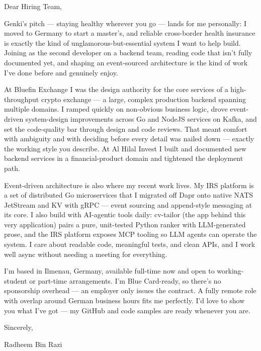 \documentclass[11pt,a4paper]{coverletter}
\begin{document}

\opening{Dear Hiring Team,}

Genki's pitch — staying healthy wherever you go — lands for me personally: I moved to Germany to start a master's, and reliable cross-border health insurance is exactly the kind of unglamorous-but-essential system I want to help build. Joining as the second developer on a backend team, reading code that isn't fully documented yet, and shaping an event-sourced architecture is the kind of work I've done before and genuinely enjoy.

At Bluefin Exchange I was the design authority for the core services of a high-throughput crypto exchange — a large, complex production backend spanning multiple domains. I ramped quickly on non-obvious business logic, drove event-driven system-design improvements across Go and NodeJS services on Kafka, and set the code-quality bar through design and code reviews. That meant comfort with ambiguity and with deciding before every detail was nailed down — exactly the working style you describe. At Al Hilal Invest I built and documented new backend services in a financial-product domain and tightened the deployment path.

Event-driven architecture is also where my recent work lives. My IRS platform is a set of distributed Go microservices that I migrated off Dapr onto native NATS JetStream and KV with gRPC — event sourcing and append-style messaging at its core. I also build with AI-agentic tools daily: cv-tailor (the app behind this very application) pairs a pure, unit-tested Python ranker with LLM-generated prose, and the IRS platform exposes MCP tooling so LLM agents can operate the system. I care about readable code, meaningful tests, and clean APIs, and I work well async without needing a meeting for everything.

I'm based in Ilmenau, Germany, available full-time now and open to working-student or part-time arrangements. I'm Blue Card-ready, so there's no sponsorship overhead — an employer only issues the contract. A fully remote role with overlap around German business hours fits me perfectly. I'd love to show you what I've got — my GitHub and code samples are ready whenever you are.

\closing{Sincerely,}{Radheem Bin Razi}

\clearpage
{}

\end{document}
